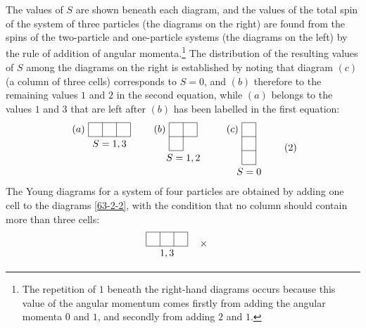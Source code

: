 {The values of $ S $ are shown beneath each diagram, and the values of the total spin of the system of three particles (the diagrams on the right) are found from the spins of the two-particle and one-particle systems (the diagrams on the left) by the rule of addition of angular momenta.\footnote{The repetition of $ 1 $ beneath the right-hand diagrams occurs because this value of the angular momentum comes firstly from adding the angular momenta $ 0 $ and $ 1 $, and secondly from adding $ 2 $ and $ 1 $.
} The distribution of the resulting values of $ S $ among the diagrams on the right is established by noting that diagram $ (c) $ (a column of three cells) corresponds to $ S = 0 $, and $ (b) $ therefore to the remaining values $ 1 $ and $ 2 $ in the second equation, while $ (a) $ belongs to the values $ 1 $ and $ 3 $ that are left after $ (b) $ has been labelled in the first equation:
\begin{equation}\label{63-2-2}
\begin{tikzpicture}[baseline,scale=0.5]
\draw (0,1)--(3,1);
\draw (0,2)--(3,2);
\draw (0,1)--(0,2);
\draw (1,1)--(1,2);
\draw (2,1)--(2,2);
\draw (3,1)--(3,2);
\node[left] at (0,1.5) {$ (a) $};
\node[below] at (1.5,1) {$ S=1,3 $};
\end{tikzpicture}\qquad\begin{tikzpicture}[baseline,scale=0.5]
\draw (0,1)--(2,1);
\draw (0,2)--(2,2);
\draw (0,0)--(1,0);
\draw (0,0)--(0,2);
\draw (1,0)--(1,2);
\draw (2,1)--(2,2);
\node[left] at (0,1.5) {$ (b) $};
\node[below] at (1,0) {$ S=1,2 $};
\end{tikzpicture}\qquad\begin{tikzpicture}[baseline,scale=0.5]
\draw (0,-1)--(0,2);
\draw (1,-1)--(1,2);
\draw (0,-1)--(1,-1);
\draw (0,0)--(1,0);
\draw (0,1)--(1,1);
\draw (0,2)--(1,2);
\node[left] at (0,1.5) {$ (c) $};
\node[below] at (0.5,-1) {$ S=0 $};
\end{tikzpicture}\tag{2}
\end{equation}
The Young diagrams for a system of four particles are obtained by adding one cell to the diagrams \eqref{63-2-2}, with the condition that no column should contain more than three cells:
\begin{equation*}
\begin{split}
\begin{tikzpicture}[baseline,scale=0.5]
\draw (0,0)--(3,0);
\draw (0,1)--(3,1);
\draw (0,0)--(0,1);
\draw (1,0)--(1,1);
\draw (2,0)--(2,1);
\draw (3,0)--(3,1);
\node[below] at (1.5,0) {$ 1,3 $};
\end{tikzpicture}\quad\times\quad\begin{tikzpicture}[baseline,scale=0.5]

\end{tikzpicture}
\end{split}
\end{equation*}}
